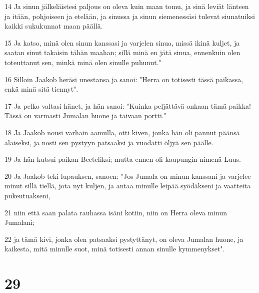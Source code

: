\par 14 Ja sinun jälkeläistesi paljous on oleva kuin maan tomu, ja sinä leviät länteen ja itään, pohjoiseen ja etelään, ja sinussa ja sinun siemenessäsi tulevat siunatuiksi kaikki sukukunnat maan päällä.
\par 15 Ja katso, minä olen sinun kanssasi ja varjelen sinua, missä ikinä kuljet, ja saatan sinut takaisin tähän maahan; sillä minä en jätä sinua, ennenkuin olen toteuttanut sen, minkä minä olen sinulle puhunut."
\par 16 Silloin Jaakob heräsi unestansa ja sanoi: "Herra on totisesti tässä paikassa, enkä minä sitä tiennyt".
\par 17 Ja pelko valtasi hänet, ja hän sanoi: "Kuinka peljättävä onkaan tämä paikka! Tässä on varmasti Jumalan huone ja taivaan portti."
\par 18 Ja Jaakob nousi varhain aamulla, otti kiven, jonka hän oli pannut päänsä alaiseksi, ja nosti sen pystyyn patsaaksi ja vuodatti öljyä sen päälle.
\par 19 Ja hän kutsui paikan Beeteliksi; mutta ennen oli kaupungin nimenä Luus.
\par 20 Ja Jaakob teki lupauksen, sanoen: "Jos Jumala on minun kanssani ja varjelee minut sillä tiellä, jota nyt kuljen, ja antaa minulle leipää syödäkseni ja vaatteita pukeutuakseni,
\par 21 niin että saan palata rauhassa isäni kotiin, niin on Herra oleva minun Jumalani;
\par 22 ja tämä kivi, jonka olen patsaaksi pystyttänyt, on oleva Jumalan huone, ja kaikesta, mitä minulle suot, minä totisesti annan sinulle kymmenykset".

\chapter{29}

